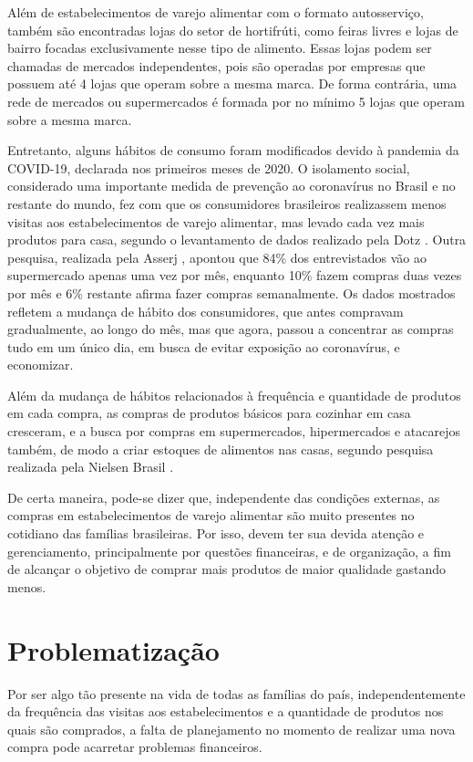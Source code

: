 Além de estabelecimentos de varejo alimentar com o formato autosserviço, também são encontradas lojas do setor de hortifrúti, como feiras livres e lojas de bairro focadas exclusivamente nesse tipo de alimento. Essas lojas podem ser chamadas de mercados independentes, pois são operadas por empresas que possuem até 4 lojas que operam sobre a mesma marca. De forma contrária, uma rede de mercados ou supermercados é formada por no mínimo 5 lojas que operam sobre a mesma marca.

Entretanto, alguns hábitos de consumo foram modificados devido à pandemia da COVID-19, declarada nos primeiros meses de 2020. O isolamento social, considerado uma importante medida de prevenção ao coronavírus no Brasil e no restante do mundo, fez com que os consumidores brasileiros realizassem menos visitas aos estabelecimentos de varejo alimentar, mas levado cada vez mais produtos para casa, segundo o levantamento de dados realizado pela Dotz \cite{Dotz}. Outra pesquisa, realizada pela Asserj \cite{Asserj}, apontou que 84\% dos entrevistados vão ao supermercado apenas uma vez por mês, enquanto 10\% fazem compras duas vezes por mês e 6\% restante afirma fazer compras semanalmente. Os dados mostrados refletem a mudança de hábito dos consumidores, que antes compravam gradualmente, ao longo do mês, mas que agora, passou a concentrar as compras tudo em um único dia, em busca de evitar exposição ao coronavírus, e economizar.

Além da mudança de hábitos relacionados à frequência e quantidade de produtos em cada compra, as compras de produtos básicos para cozinhar em casa cresceram, e a busca por compras em supermercados, hipermercados e atacarejos também, de modo a criar estoques de alimentos nas casas, segundo pesquisa realizada pela Nielsen Brasil \cite{NielsenBrasil}.

De certa maneira, pode-se dizer que, independente das condições externas, as compras em estabelecimentos de varejo alimentar são muito presentes no cotidiano das famílias brasileiras. Por isso, devem ter sua devida atenção e gerenciamento, principalmente por questões financeiras, e de organização, a fim de alcançar o objetivo de comprar mais produtos de maior qualidade gastando menos.

\label{sec:problematizacao}
\section{Problematização}
Por ser algo tão presente na vida de todas as famílias do país, independentemente da frequência das visitas aos estabelecimentos e a quantidade de produtos nos quais são comprados, a falta de planejamento no momento de realizar uma nova compra pode acarretar problemas financeiros.

